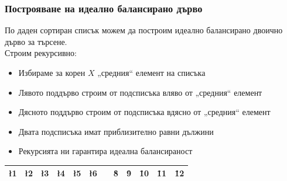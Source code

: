 \documentclass[alsotrans,beameroptions={aspectratio=169}]{beamerswitch}
\begin{document}
\begin{frame}
  \frametitle{Построяване на идеално балансирано дърво}
  По даден сортиран списък можем да построим идеално балансирано двоично дърво за търсене.\\[2ex]
  Строим рекурсивно:
  \begin{itemize}
  \item Избираме за корен $X$ „средния“ елемент на списъка
  \item Лявото поддърво строим от подсписъка вляво от „средния“ елемент
  \item Дясното поддърво строим от подсписъка вдясно от „средния“ елемент
  \item Двата подсписъка имат приблизително равни дължини
  \item Рекурсията ни гарантира идеална балансираност
  \end{itemize}
  \begin{center}
    \begin{tabular}{*{12}{|c}|}
      \hline
      \l1&\l2&\l3&\l4&\l5&\l6&&\r8&\r9&\r10&\r11&\r12\\
      \hline
    \end{tabular}
  \end{center}
\end{frame}
\end{document}
